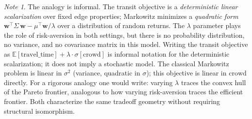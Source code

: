 \documentclass[11pt, a4paper]{article}
\theoremstyle{remark}
\newtheorem*{note}{Note}
\newcommand{\crowd}{\mathrm{crowd}}
\newcommand{\E}{\mathbb{E}}
\begin{document}
\begin{note}
The analogy is informal. The transit objective is a \emph{deterministic linear
scalarization} over fixed edge properties; Markowitz minimizes a \emph{quadratic
form} $\mathbf{w}^\top \Sigma\, \mathbf{w} - \mu^\top\mathbf{w}/\lambda$ over
a distribution of random returns. The $\lambda$ parameter plays the role of
risk-aversion in both settings, but there is no probability distribution, no
variance, and no covariance matrix in this model. Writing the transit objective
as $\E[\text{travel\_time}] + \lambda \cdot \sigma[\crowd]$ is informal notation
for the deterministic scalarization; it does not imply a stochastic model.
The classical Markowitz problem is linear in $\sigma^2$ (variance, quadratic in
$\sigma$); this objective is linear in $\crowd$ directly. For a rigorous analogy
one would write: varying $\lambda$ traces the convex hull of the Pareto frontier,
analogous to how varying risk-aversion traces the efficient frontier. Both
characterize the same tradeoff geometry without requiring structural isomorphism.
\end{note}
\end{document}
